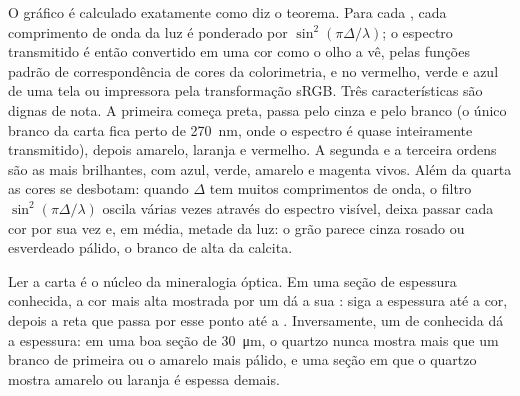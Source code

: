 O gráfico é calculado exatamente como diz o teorema. Para cada , cada comprimento de onda da luz é ponderado por $\sin^2(\pi\Delta/\lambda)$; o espectro transmitido é então convertido em uma cor como o olho a vê, pelas funções padrão de correspondência de cores da colorimetria, e no vermelho, verde e azul de uma tela ou impressora pela transformação sRGB. Três características são
dignas de nota. A primeira  começa preta, passa pelo cinza e pelo branco (o único branco da carta fica perto de \qty{270}{nm}, onde o espectro é quase inteiramente transmitido), depois amarelo, laranja e vermelho. A segunda e a terceira ordens são as mais brilhantes, com azul, verde, amarelo e magenta vivos. Além da quarta  as cores se desbotam: quando $\Delta$ tem muitos comprimentos de onda, o filtro $\sin^2(\pi\Delta/\lambda)$ oscila várias vezes através do espectro visível, deixa passar cada cor por sua vez e, em média, metade da luz: o grão parece cinza rosado ou esverdeado pálido, o branco de  alta da calcita.

Ler a carta é o núcleo da mineralogia óptica. Em uma seção de espessura conhecida, a cor mais alta mostrada por um  dá a sua : siga a espessura até a cor, depois a reta que passa por esse ponto até a . Inversamente, um  de  conhecida dá a espessura: em uma boa seção de \qty{30}{\micro m}, o quartzo nunca mostra mais que um branco de primeira  ou o amarelo mais pálido, e uma seção em que o quartzo mostra amarelo ou laranja é espessa demais.

